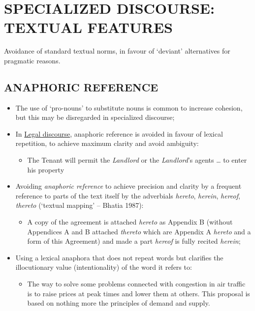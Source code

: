 \section{SPECIALIZED DISCOURSE: TEXTUAL FEATURES}

Avoidance of standard textual norms, in favour of ‘deviant’ alternatives for pragmatic reasons. 

\subsection{ANAPHORIC REFERENCE} 

\begin{itemize}

\item The use of ‘pro-nouns’ to substitute nouns is common to increase cohesion, but this may be disregarded in specialized discourse;
\item In \underline{Legal discourse}, anaphoric reference is avoided in favour of lexical repetition, to achieve maximum clarity and avoid ambiguity:

\begin{itemize}
\item The Tenant will permit the \textit{Landlord} or the \textit{Landlord}’s agents … to enter his property 
\end{itemize}

\item Avoiding \textit{anaphoric reference} to achieve precision and clarity by a frequent reference to parts of the text itself by the adverbials \textit{hereto}, \textit{herein}, \textit{hereof}, \textit{thereto} (‘textual mapping’ – Bhatia 1987): 

\begin{itemize}
\item A copy of the agreement is attached \textit{hereto} as Appendix B (without Appendices A and B attached \textit{thereto} which are Appendix A \textit{hereto} and a form of this Agreement) and made a part \textit{hereof} is fully recited \textit{herein};
\end{itemize}

\item Using a lexical anaphora that does not repeat words but clarifies the illocutionary value (intentionality) of the word it refers to:

\begin{itemize}
\item The way to solve some problems connected with congestion in air traffic is to raise prices at peak times and lower them at others. This proposal is based on nothing more the principles of demand and supply.
\end{itemize}

\end{itemize}

